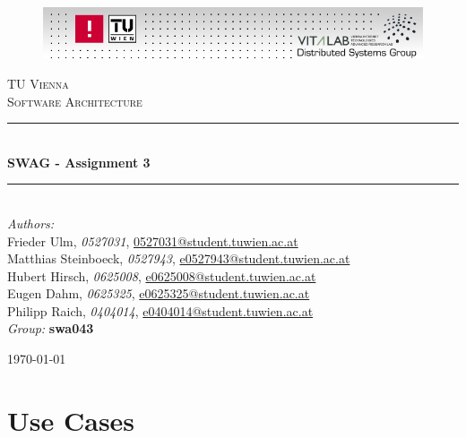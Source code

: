 \documentclass[a4paper]{article}
\makeatletter
\newcommand{\TITLE}{SWAG - Assignment 3}
\newcommand{\AUTHOR}{Philipp Raich, \emph{0404014}}
\newcommand{\AUTHORTWO}{Frieder Ulm, \emph{0527031}}
\newcommand{\AUTHORTHREE}{Matthias Steinboeck, \emph{0527943}}
\newcommand{\AUTHORFOUR}{Hubert Hirsch, \emph{0625008}}
\newcommand{\AUTHORFIVE}{Eugen Dahm, \emph{0625325}}
\newcommand{\GROUP}{swa043}
\newcommand{\MAIL}{\href{mailto:e0404014@student.tuwien.ac.at}{e0404014@student.tuwien.ac.at}}
\newcommand{\MAILTWO}{\href{mailto:e0527031@student.tuwien.ac.at}{0527031@student.tuwien.ac.at}}
\newcommand{\MAILTHREE}{\href{mailto:e0527943@student.tuwien.ac.at}{e0527943@student.tuwien.ac.at}}
\newcommand{\MAILFOUR}{\href{mailto:e0625008@student.tuwien.ac.at}{e0625008@student.tuwien.ac.at}}
\newcommand{\MAILFIVE}{\href{mailto:e0625325@student.tuwien.ac.at}{e0625325@student.tuwien.ac.at}}
\newcommand{\HRule}{\rule{\linewidth}{0.25mm}}
\makeatother
\begin{document}
\begin{titlepage}

\begin{center}

\begin{figure}[ht!]
  \begin{center}
  \includegraphics[width=1\textwidth]{fig/vitalab-header.png}
  \label{fig:component_diagram}
  \end{center}
\end{figure}

\textsc{\LARGE TU Vienna}\\[1.5cm]

\textsc{\Large Software Architecture}\\[0.5cm]


\HRule \\[0.4cm]
{ \huge \bfseries \TITLE}\\[0.15cm]

\HRule \\[1.5cm]

\emph{Authors:}\\
\large{\AUTHORTWO, \MAILTWO\\
\AUTHORTHREE, \MAILTHREE\\
\AUTHORFOUR, \MAILFOUR\\
\AUTHORFIVE, \MAILFIVE\\
\AUTHOR, \MAIL\\}
\vfill
\normalsize\emph{Group:}
\large\textbf{\GROUP}\\

\vfill

{\normalsize \today}

\end{center}

\end{titlepage}

\tableofcontents

\clearpage

\section{Use Cases}
\end{document}
